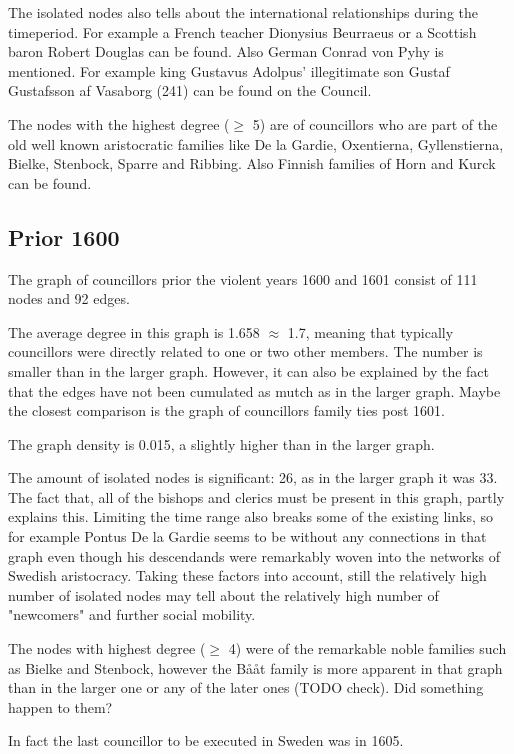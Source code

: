 The isolated nodes also tells about the international relationships during the timeperiod. For example a French teacher Dionysius Beurraeus or a Scottish baron Robert Douglas can be found. Also German Conrad von Pyhy is mentioned.
For example king Gustavus Adolpus' illegitimate son Gustaf Gustafsson af Vasaborg (241) can be found on the Council. 

The nodes with the highest degree ($\geq$ 5) are of councillors who are part of the old well known aristocratic families like De la Gardie, Oxentierna, Gyllenstierna, Bielke, Stenbock, Sparre and Ribbing. Also Finnish families of Horn and Kurck can be found. 

\subsection{Prior 1600}
The graph of councillors prior the violent years 1600 and 1601 consist of 111 nodes and 92 edges. 

The average degree in this graph is 1.658 $\approx$ 1.7, meaning that typically councillors were directly related to one or two other members. The number is smaller than in the larger graph. However, it can also be explained by the fact that the edges have not been cumulated as mutch as in the larger graph. Maybe the closest comparison is the graph of councillors family ties post 1601.

The graph density is 0.015, a slightly higher than in the larger graph. 

The amount of isolated nodes is significant: 26, as in the larger graph it was 33. The fact that, all of the bishops and clerics must be present in this graph, partly explains this. Limiting the time range also breaks some of the existing links, so for example Pontus De la Gardie seems to be without any connections in that graph even though his descendands were remarkably woven into the networks of Swedish aristocracy. Taking these factors into account, still the relatively high number of isolated nodes may tell about the relatively high number of "newcomers" and further social mobility.

The nodes with highest degree ($\geq$ 4) were of the remarkable noble families such as Bielke and Stenbock, however the Bååt family is more apparent in that graph than in the larger one or any of the later ones (TODO check). Did something happen to them?

In fact the last councillor to be executed in Sweden was in 1605.%

